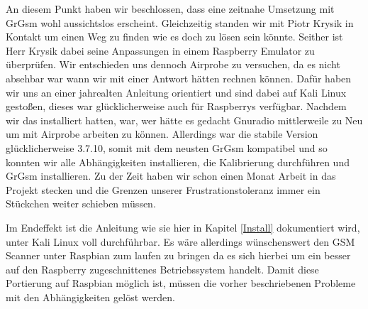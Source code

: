 An diesem Punkt haben wir beschlossen, dass eine zeitnahe Umsetzung mit GrGsm wohl aussichtslos erscheint. Gleichzeitig standen wir mit Piotr Krysik in Kontakt um einen Weg zu finden wie es doch zu lösen sein könnte. Seither ist Herr Krysik dabei seine Anpassungen in einem Raspberry Emulator zu überprüfen. Wir entschieden uns dennoch Airprobe zu versuchen, da es nicht absehbar war wann wir mit einer Antwort hätten rechnen können. Dafür haben wir uns an einer jahrealten Anleitung orientiert und sind dabei auf Kali Linux gestoßen, dieses war glücklicherweise auch für Raspberrys verfügbar. Nachdem wir das installiert hatten, war, wer hätte es gedacht Gnuradio mittlerweile zu Neu um mit Airprobe arbeiten zu können. Allerdings war die stabile Version glücklicherweise 3.7.10, somit mit dem neusten GrGsm kompatibel und so konnten wir alle Abhängigkeiten installieren, die Kalibrierung durchführen und GrGsm installieren. Zu der Zeit haben wir schon einen Monat Arbeit in das Projekt stecken und die Grenzen unserer Frustrationstoleranz immer ein Stückchen weiter schieben müssen.

Im Endeffekt ist die Anleitung wie sie hier in Kapitel \ref{Install} dokumentiert wird, unter Kali Linux voll durchführbar. Es wäre allerdings wünschenswert den GSM Scanner unter Raspbian zum laufen zu bringen da es sich hierbei um ein besser auf den Raspberry zugeschnittenes Betriebssystem handelt. 
Damit diese Portierung auf Raspbian möglich ist, müssen die vorher beschriebenen Probleme mit den Abhängigkeiten gelöst werden. 
